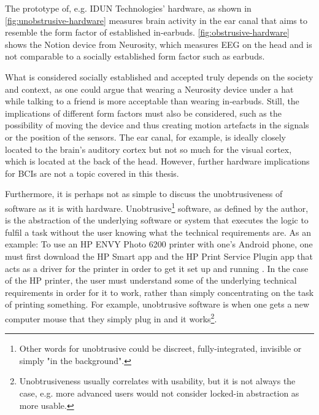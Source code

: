 The prototype of, e.g. IDUN Technologies' hardware, as shown in \autoref{fig:unobstrusive-hardware} measures brain activity in the ear canal that aims to resemble the form factor of established in-earbuds. \autoref{fig:obstrusive-hardware} shows the Notion device from Neurosity, which measures EEG on the head and is not comparable to a socially established form factor such as earbuds.

What is considered socially established and accepted truly depends on the society and context, as one could argue that wearing a Neurosity device under a hat while talking to a friend is more acceptable than wearing in-earbuds. Still, the implications of different form factors must also be considered, such as the possibility of moving the device and thus creating motion artefacts in the signals or the position of the sensors. The ear canal, for example, is ideally closely located to the brain's auditory cortex but not so much for the visual cortex, which is located at the back of the head. However, further hardware implications for BCIs are not a topic covered in this thesis.

Furthermore, it is perhaps not as simple to discuss the unobtrusiveness of software as it is with hardware. Unobtrusive\footnote{Other words for unobtrusive could be discreet, fully-integrated, invisible or simply "in the background".} software, as defined by the author, is the abstraction of the underlying software or system that executes the logic to fulfil a task without the user knowing what the technical requirements are. As an example: To use an HP ENVY Photo 6200 printer with one's Android phone, one must first download the HP Smart app and the HP Print Service Plugin app that acts as a driver for the printer in order to get it set up and running \citep{hp_hp_nodate}. In the case of the HP printer, the user must understand some of the underlying technical requirements in order for it to work, rather than simply concentrating on the task of printing something. For example, unobtrusive software is when one gets a new computer mouse that they simply plug in and it works\footnote{Unobtrusiveness usually correlates with usability, but it is not always the case, e.g. more advanced users would not consider locked-in abstraction as more usable.}.

